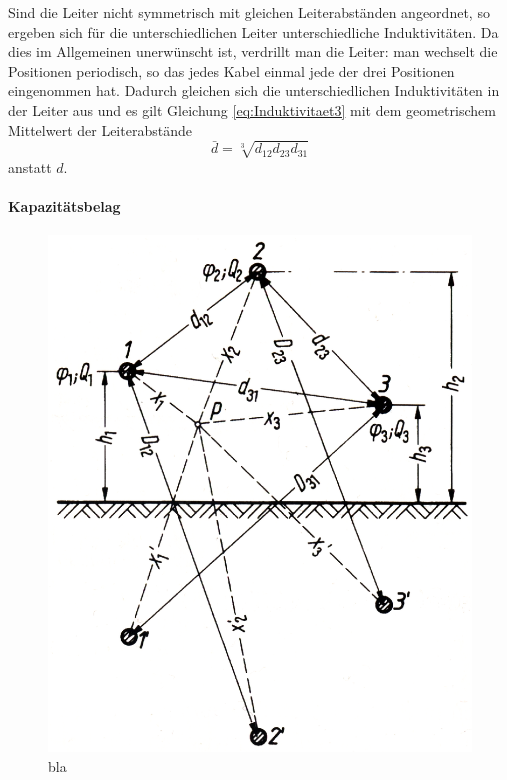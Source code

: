 Sind die Leiter nicht symmetrisch mit gleichen Leiterabständen angeordnet, so ergeben sich für die unterschiedlichen Leiter unterschiedliche Induktivitäten. Da dies im Allgemeinen unerwünscht ist, verdrillt man die Leiter: man wechselt die Positionen periodisch, so das jedes Kabel einmal jede der drei Positionen eingenommen hat. Dadurch gleichen sich die unterschiedlichen Induktivitäten in der Leiter aus und es gilt Gleichung \eqref{eq:Induktivitaet3} mit dem geometrischem Mittelwert der Leiterabstände
\begin{equation}
\bar{d} = \sqrt[3]{d_{12}d_{23}d_{31}}
\end{equation}
anstatt $d$.

\paragraph{Kapazitätsbelag}
\begin{figure}[tbhn]
\begin{center}
\noindent
\includegraphics[scale=1]{gespiegelterdrehstrom.png}
\end{center}
\caption{bla} %
\label{pic:gespiegelterdrehstrom} 
\end{figure}

